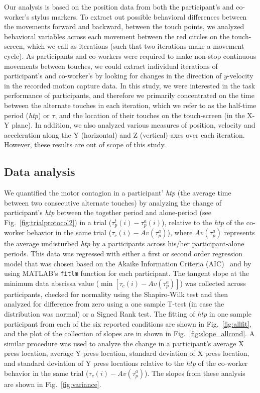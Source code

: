 Our analysis is based on the position data from both the participant's and co-worker's stylus markers. To extract out possible behavioral differences between the movements forward and backward, between the touch points, we analyzed behavioral variables across each movement between the red circles on the touch-screen, which we call as iterations (such that two iterations make a movement cycle). As participants and co-workers were required to make non-stop continuous movements between touches, we could extract individual iterations of participant's and co-worker's by looking for changes in the direction of $y$-velocity in the recorded motion capture data. In this study, we were interested in the task performance of participants, and therefore we primarily concentrated on the time between the alternate touches in each iteration, which we refer to as the half-time period ({\it htp}) or $\tau$, and the location of their touches on the touch-screen (in the X-Y plane). In addition, we also analyzed various measures of position, velocity and acceleration along the Y (horizontal) and Z (vertical) axes over each iteration. However, these results are out of scope of this study.

\subsection{Data analysis} \label{data_analysis}

We quantified the motor contagion in a participant' {\it htp} (the average time between two consecutive alternate touches) by analyzing the change of participant's {\it htp} between the together period and alone-period (see Fig.~\ref{fig:trialprotocol2}) in a trial ($\tau_p^t(i)-\tau_p^a(i)$), relative to the {\it htp} of the co-worker behavior in the same trial ($\tau_c (i)-Av(\tau_p^a)$), where $Av(\tau_p^a)$ represents the average undisturbed {\it htp} by a participants across his/her participant-alone periods. This data was regressed with either a first or second order regression model that was chosen based on the Akaike Information Criteria (AIC)~\cite{Akaike:ISIT:1973} and by using MATLAB's {\tt fitlm} function for each participant. The tangent slope at the minimum data abscissa value ($\min[\tau_c(i)-Av(\tau_p^a)]$) was collected across participants, checked for normality using the Shapiro-Wilk test and then analyzed for difference from zero using a one sample T-test (in case the distribution was normal) or a Signed Rank test. The fitting of {\it htp} in one sample participant from each of the six reported conditions are shown in Fig.~\ref{fig:allfit}, and the plot of the collection of slopes are in shown in Fig.~\ref{fig:slope_allcond}. A similar procedure was used to analyze the change in a participant's average X press location, average Y press location, standard deviation of X press location, and standard deviation of Y press locations relative to the {\it htp} of the co-worker behavior in the same trial ($\tau_c(i)-Av(\tau_p^a)$). The slopes from these analysis are shown in Fig.~\ref{fig:variance}.

